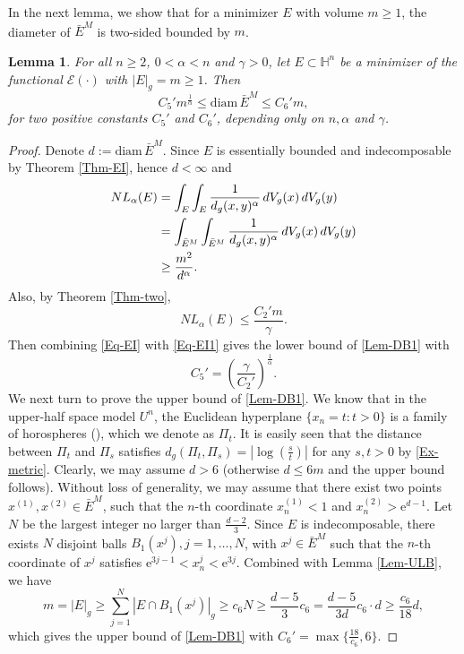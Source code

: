 \documentclass[11pt,reqno]{amsart}
\newtheorem{lem}[thm]{Lemma}
\theoremstyle{definition}
\theoremstyle{remark}
\numberwithin{equation}{section}
\renewcommand{\(}{\left(}
\renewcommand{\)}{\right)}
\renewcommand{\-}{\overline}
\begin{document}
In the next lemma, we show that for a minimizer $E$ with volume $m\geq 1$, the diameter of $\bar{E}^M$ is two-sided bounded by $m$.
\begin{lem}\label{Lem-DB}
	 For all $n\geq 2$, $0<\alpha<n$ and $\gamma>0$, let $E\subset\mathbb{H}^n$ be a minimizer of the functional $\mathcal{E}(\cdot)$ with $|E|_g=m\geq 1$. Then
\begin{equation}\label{Lem-DB1}
	C_5' m^{\frac{1}{\alpha}}\leq \mathrm{diam}\, \bar{E}^M\leq C_6' m,
\end{equation} 
for two positive constants $C_5'$ and $C_6'$, depending only on $n, \alpha$ and $\gamma$. 
\end{lem}
\begin{proof}
	Denote $d:=\mathrm{diam}\,\bar{E}^M$. Since $E$ is essentially bounded and indecomposable by Theorem \ref{Thm-EI}, hence $d<\infty$ and 
	\begin{align}
		NL_{\alpha}(E)&=\int_{E}\int_{E}{\frac{1}{d_g(x,y)^{\alpha}}}\,dV_g(x)\,dV_g(y)\notag\\
		&=\int_{\bar{E}^M}\int_{\bar{E}^M}{\frac{1}{d_g(x,y)^{\alpha}}}\,dV_g(x)\,dV_g(y)\notag\\
		&\geq\frac{m^2}{d^{\alpha}}.\label{Eq-EI}
	\end{align}
	Also, by Theorem \ref{Thm-two}, 
	\begin{equation}\label{Eq-EI1}
		NL_{\alpha}(E)\leq \frac{C_2' m}{\gamma}.
	\end{equation}
	Then combining \eqref{Eq-EI} with \eqref{Eq-EI1} gives the lower bound of \eqref{Lem-DB1} with 
	\begin{equation}\label{Eq-EI2}
		C_5'=\left(\frac{\gamma}{C_2'}\right)^{\frac{1}{\alpha}}.
	\end{equation}
	We next turn to prove the upper bound of \eqref{Lem-DB1}. We know that in the upper-half space model $U^n$, the Euclidean hyperplane $\{x_{n}=t:t>0\}$ is a family of horospheres (\cite[Theorem 4.6.5]{Ratcliffe19}), which we denote as $\Pi_t$. It is easily seen that the distance between $\Pi_t$ and $\Pi_s$ satisfies $d_g(\Pi_t, \Pi_s)=|\log(\frac{s}{t})|$ for any $s, t>0$ by \eqref{Ex-metric}. Clearly, we may assume $d>6$ (otherwise $d\leq 6m$ and the upper bound follows). Without loss of generality, we may assume that there exist two points $x^{(1)}, x^{(2)}\in\bar{E}^M$, such that the $n$-th coordinate $x_n^{(1)}<1$ and $x_n^{(2)}>\mathrm{e}^{d-1}$. Let $N$ be the largest integer no larger than $\frac{d-2}{3}$. Since $E$ is indecomposable, there exists $N$ disjoint balls $B_1(x^j), j=1,\dots,N$, with $x^j\in\bar{E}^M$ such that the $n$-th coordinate of $x^j$ satisfies $\mathrm{e}^{3j-1}<x^j_n<\mathrm{e}^{3j}$. Combined with Lemma \ref{Lem-ULB}, we have
	\begin{equation*}
		m=|E|_g\geq \sum_{j=1}^N |E\cap B_1(x^j)|_g\geq c_6 N\geq \frac{d-5}{3}c_6= \frac{d-5}{3d}c_6\cdot d\geq \frac{c_6}{18}d,
	\end{equation*}
	which gives the upper bound of \eqref{Lem-DB1} with $C_6'=\max\{\frac{18}{c_6}, 6\}$. 
\end{proof}
\end{document}
